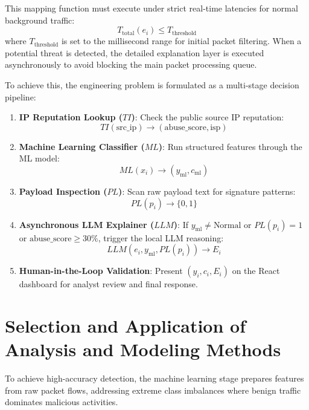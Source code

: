 \documentclass[12pt,a4paper]{report}
\begin{document}
This mapping function must execute under strict real-time latencies for normal background traffic:
\begin{equation}
  T_{\text{total}}(e_i) \le T_{\text{threshold}}
\end{equation}
where $T_{\text{threshold}}$ is set to the millisecond range for initial packet filtering. When a potential threat is detected, the detailed explanation layer is executed asynchronously to avoid blocking the main packet processing queue.

To achieve this, the engineering problem is formulated as a multi-stage decision pipeline:
\begin{enumerate}[leftmargin=1.5em]
  \item \textbf{IP Reputation Lookup ($TI$)}: Check the public source IP reputation:
    \begin{equation}
      TI(\text{src\_ip}) \to (\text{abuse\_score}, \text{isp})
    \end{equation}
  \item \textbf{Machine Learning Classifier ($ML$)}: Run structured features through the ML model:
    \begin{equation}
      ML(x_i) \to (y_{\text{ml}}, c_{\text{ml}})
    \end{equation}
  \item \textbf{Payload Inspection ($PL$)}: Scan raw payload text for signature patterns:
    \begin{equation}
      PL(p_i) \to \{0, 1\}
    \end{equation}
  \item \textbf{Asynchronous LLM Explainer ($LLM$)}: If $y_{\text{ml}} \ne \text{Normal}$ or $PL(p_i) = 1$ or $\text{abuse\_score} \ge 30\%$, trigger the local LLM reasoning:
    \begin{equation}
      LLM(e_i, y_{\text{ml}}, PL(p_i)) \to E_i
    \end{equation}
  \item \textbf{Human-in-the-Loop Validation}: Present $(y_i, c_i, E_i)$ on the React dashboard for analyst review and final response.
\end{enumerate}

\section{Selection and Application of Analysis and Modeling Methods}

To achieve high-accuracy detection, the machine learning stage prepares features from raw packet flows, addressing extreme class imbalances where benign traffic dominates malicious activities.
\end{document}
